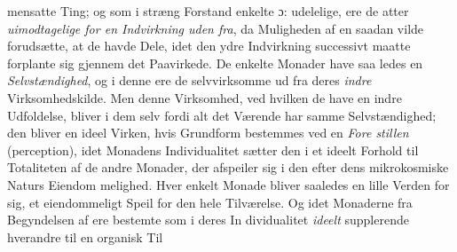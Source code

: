 \documentclass[12pt,a4paper]{book}
\begin{document}
mensatte Ting; og som i stræng Forstand enkelte ɔ: udelelige,
ere de atter \emph{uimodtagelige for en Indvirkning uden\-%
fra}, da Muligheden af en saadan vilde forudsætte, at de havde
Dele, idet den ydre Indvirkning successivt maatte forplante
sig gjennem det Paavirkede. De enkelte Monader have saa\-%
ledes en \emph{Selvstændighed}, og i denne ere de selvvirksomme
ud fra deres \emph{indre} Virksomhedskilde. Men denne Virksomhed,
ved hvilken de have en indre Udfoldelse, bliver i dem selv
fordi alt det Værende har samme Selvstændighed; den bliver
en ideel Virken, hvis Grundform bestemmes ved en \emph{Fore\-%
stillen} (perception), idet Monadens Individualitet sætter den
i et ideelt Forhold til Totaliteten af de andre Monader, der
afspeiler sig i den efter dens mikrokosmiske Naturs Eiendom\-%
melighed. Hver enkelt Monade bliver saaledes en lille Verden
for sig, et eiendommeligt Speil for den hele Tilværelse. Og
idet Monaderne fra Begyndelsen af ere bestemte som i deres In\-%
dividualitet \emph{ideelt} supplerende hverandre til en organisk Til\-%
\end{document}
